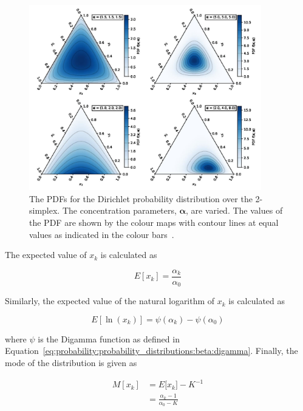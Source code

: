 \begin{figure}[htb]
      \centering
      \includegraphics[width=0.9\textwidth]{images/dirichlet.pdf}
      \caption{The \acfp{PDF} for the Dirichlet probability distribution over the 2-simplex. The concentration parameters, $\boldsymbol{\alpha}$, are varied. The values of the \acs{PDF} are shown by the colour maps with contour lines at equal values as indicated in the colour bars~\cite{ref:dirichlet:2020}.}
      \label{fig:probability:probability_distributions:dirichlet}
\end{figure}

The expected value of $x_{k}$ is calculated as

\begin{equation}
      \label{eq:probability:probability_distributions:dirichlet:expected_value}
      E[x_{k}] = \frac{\alpha_{k}}{\alpha_{0}}
\end{equation}

Similarly, the expected value of the natural logarithm of $x_{k}$ is calculated as

\begin{equation}
      \label{eq:probability:probability_distributions:dirichlet:expected_value_ln}
      E[\ln(x_{k})] = \psi({\alpha_{k}}) - \psi(\alpha_{0})
\end{equation}

where $\psi$ is the Digamma function as defined in Equation~\eqref{eq:probability:probability_distributions:beta:digamma}. Finally, the mode of the distribution is given as

\begin{equation}
      \label{eq:probability:probability_distributions:dirichlet:mode}
      \begin{split}
            M[x_{k}] &= E[{x_{k}] -K^{-1}} \\
            &=  \frac{\alpha_{k} - 1}{\alpha_{0} - K}
      \end{split}
\end{equation}


